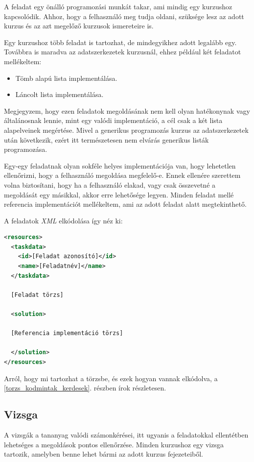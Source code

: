 \documentclass[12pt,a4paper]{article}
\newcommand{\xml}{\textit{XML}\xspace}
\begin{document}
	A feladat egy önálló programozási munkát takar, ami mindig egy kurzushoz kapcsolódik. Ahhoz, hogy a felhasználó meg tudja oldani, szüksége lesz az adott kurzus és az azt megelőző kurzusok ismereteire is.
	
	Egy kurzushoz több feladat is tartozhat, de mindegyikhez adott legalább egy. Továbbra is maradva az adatszerkezetek kurzusnál, ehhez például két feladatot mellékeltem:
	
	\begin{itemize}
		\item Tömb alapú lista implementálása.
		\item Láncolt lista implementálása.
	\end{itemize}

	Megjegyzem, hogy ezen feladatok megoldásának nem kell olyan hatékonynak vagy általánosnak lennie, mint egy valódi implementáció, a cél csak a két lista alapelveinek megértése. Mivel a generikus programozás kurzus az adatszerkezetek után következik, ezért itt természetesen nem elvárás generikus listák programozása.

	Egy-egy feladatnak olyan sokféle helyes implementációja van, hogy lehetetlen ellenőrizni, hogy a felhasználó megoldása megfelelő-e. Ennek ellenére szerettem volna biztosítani, hogy ha a felhasználó elakad, vagy csak összevetné a megoldását egy másikkal, akkor erre lehetősége legyen. Minden feladat mellé referencia implementációt mellékeltem, ami az adott feladat alatt megtekinthető.

	A feladatok \xml elkódolása így néz ki:
	
	\begin{lstlisting}[language=XML]
<resources>
  <taskdata>
    <id>[Feladat azonosító]</id>
    <name>[Feladatnév]</name>
  </taskdata>
  
  [Feladat törzs]
  	
  <solution>
  
  [Referencia implementáció törzs]
  
  </solution>
</resources>
	\end{lstlisting}

	Arról, hogy mi tartozhat a törzsbe, és ezek hogyan vannak elkódolva, a \ref{torzs_kodmintak_kerdesek}. részben írok részletesen.

	\subsection{Vizsga}\label{vizsga}
	
	A vizsgák a tananyag valódi számonkérései, itt ugyanis a feladatokkal ellentétben lehetséges a megoldások pontos ellenőrzése. Minden kurzushoz egy vizsga tartozik, amelyben benne lehet bármi az adott kurzus fejezeteiből.
	
\end{document}
